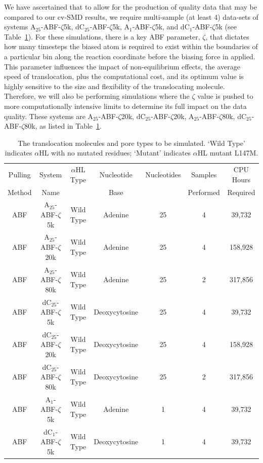\documentclass[a4paper,10pt]{article}
\newcommand{\dctfnsp}{dC$_{25}$}
\newcommand{\atfnsp}{A$_{25}$}
\newcommand{\dconsp}{dC$_{1}$}
\newcommand{\aonsp}{A$_{1}$}
\newcommand{\ahl}{$\alpha$HL }
\newcommand{\up}{\vspace*{-1em}}
\begin{document}
We have ascertained that to allow for the production of quality data that may be compared to our cv-SMD results, we require multi-sample (at least 4) data-sets of systems  \atfnsp-ABF-$\zeta$5k, \dctfnsp-ABF-$\zeta$5k,  \aonsp-ABF-$\zeta$5k,  and \dconsp-ABF-$\zeta$5k (see Table~\ref{table:systems2}). For these simulations, there is a key ABF parameter, $\zeta$, that dictates how many timesteps the biased atom is required to exist within the boundaries of a particular bin along the reaction coordinate before the biasing force in applied. This parameter influences the impact of non-equilibrium effects, the average speed of translocation, plus the computational cost, and its optimum value is highly sensitive to the size and flexibility of the translocating molecule. Therefore, we will also be performing simulations where the $\zeta$ value is pushed to more computationally intensive limits to determine its full impact on the data quality. These systems are \atfnsp-ABF-$\zeta$20k, \dctfnsp-ABF-$\zeta$20k,  \atfnsp-ABF-$\zeta$80k, \dctfnsp-ABF-$\zeta$80k, as listed in Table~\ref{table:systems2}.


\begin{table}[!h]
\begin{center}
  \caption{The translocation molecules and pore types to be simulated. `Wild Type' indicates \ahl with no mutated residues; `Mutant' indicates \ahl mutant L147M.\newline }
\label{table:systems2}
\begin{tabular}{| c | c | c | c | c | c | c |}
\hline
Pulling & System & \ahl Type & Nucleotide & Nucleotides & Samples & CPU Hours \\
Method & Name &  & Base &  & Performed & Required\\
\hline
ABF & \atfnsp-ABF-$\zeta$5k & Wild Type & Adenine & 25 & 4 & 39,732 \\
ABF & \atfnsp-ABF-$\zeta$20k & Wild Type & Adenine & 25 & 4 & 158,928 \\
ABF & \atfnsp-ABF-$\zeta$80k & Wild Type & Adenine & 25 & 2  & 317,856 \\
ABF & \dctfnsp-ABF-$\zeta$5k & Wild Type & Deoxycytosine & 25 & 4 & 39,732 \\
ABF & \dctfnsp-ABF-$\zeta$20k & Wild Type & Deoxycytosine & 25 & 4 & 158,928  \\
ABF & \dctfnsp-ABF-$\zeta$80k & Wild Type & Deoxycytosine & 25 & 2 & 317,856 \\
ABF & \aonsp-ABF-$\zeta$5k & Wild Type & Adenine & 1 & 4 &  39,732 \\
ABF & \dconsp-ABF-$\zeta$5k & Wild Type & Deoxycytosine & 1 & 4 & 39,732 \\
\hline
\end{tabular}
\end{center}
\up\up
\end{table}
\end{document}
